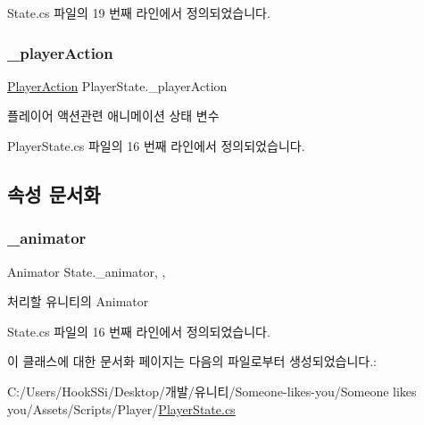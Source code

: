 State.\+cs 파일의 19 번째 라인에서 정의되었습니다.

\mbox{\label{class_player_state_a50343c632d4e11c55e97a58b4c9520ad}} 
\subsubsection{\texorpdfstring{\_playerAction}{\_playerAction}}
{\footnotesize\ttfamily \mbox{\hyperlink{class_player_state_a2909421d9f22a750c1b0eacfc9bafb3d}{Player\+Action}} Player\+State.\+\_\+player\+Action\hspace{0.3cm}{\ttfamily [protected]}}



플레이어 액션관련 애니메이션 상태 변수 



Player\+State.\+cs 파일의 16 번째 라인에서 정의되었습니다.



\subsection{속성 문서화}
\mbox{\label{class_state_aff1dd03a1b3c63053b23371d6d70cd1a}} 
\subsubsection{\texorpdfstring{\_animator}{\_animator}}
{\footnotesize\ttfamily Animator State.\+\_\+animator\hspace{0.3cm}{\ttfamily [get]}, {\ttfamily [set]}, {\ttfamily [inherited]}}



처리할 유니티의 Animator 



State.\+cs 파일의 16 번째 라인에서 정의되었습니다.


\begin{DoxyCode}{0}

\end{DoxyCode}


이 클래스에 대한 문서화 페이지는 다음의 파일로부터 생성되었습니다.\+:\begin{DoxyCompactItemize}
\item 
C\+:/\+Users/\+Hook\+S\+Si/\+Desktop/개발/유니티/\+Someone-\/likes-\/you/\+Someone likes you/\+Assets/\+Scripts/\+Player/\mbox{\hyperlink{_player_state_8cs}{Player\+State.\+cs}}\end{DoxyCompactItemize}
